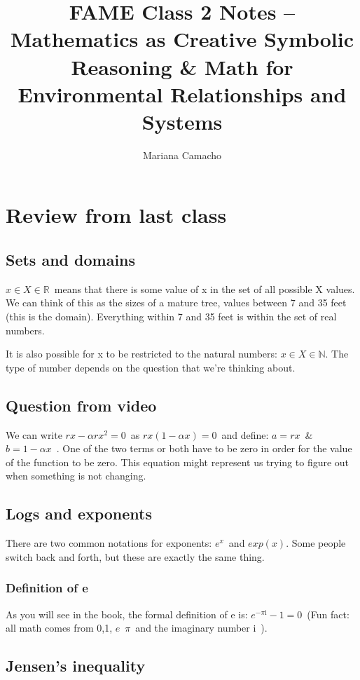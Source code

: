 \documentclass[12pt]{article}
\title{FAME Class 2 Notes -- Mathematics as Creative Symbolic Reasoning \& Math for Environmental Relationships and Systems}
\author{Mariana Camacho}
\begin{document}
\maketitle

\section{Review from last class}
\subsection{Sets and domains}
\(x\in X \in \mathbb{R} \)\ means that there is some value of x in the set of all possible X values. We can think of this as the sizes of a mature tree, values between 7 and 35 feet (this is the domain). Everything within 7 and 35 feet is within the set of real numbers. 

It is also possible for x to be restricted to the natural numbers: \(x\in X \in \mathbb{N} \). The type of number depends on the question that we're thinking about. 

\subsection{Question from video}

We can write 
\(rx-\alpha rx^2=0\)\ as \(rx(1-\alpha x)=0\)\, and define: \(a=rx\)\ \& \(b=1-\alpha x\)\ . One of the two terms or both have to be zero in order for the value of the function to be zero. This equation might represent us trying to figure out when something is not changing. 

\subsection{Logs and exponents}
There are two common notations for exponents: \(e^x\)\ and \(exp(x)\). Some people switch back and forth, but these are exactly the same thing. 

\subsubsection{Definition of e}

As you will see in the book, the formal definition of e is:
\(e^{- \pi \mathrm{i}}-1=0\)\ (Fun fact: all math comes from 0,1, \(e\)\, \(\pi\)\ and the imaginary number \(\mathrm{i} \)\ ).

\subsection{Jensen's inequality}
\end{document}
